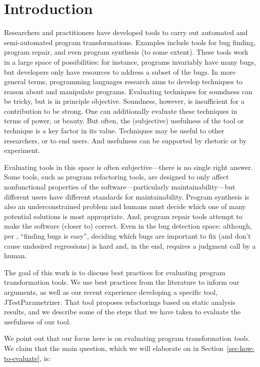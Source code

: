 \section{Introduction}
Researchers and practitioners have developed tools to carry out
automated and semi-automated program transformations.  Examples
include tools for bug finding, program repair, and even 
program synthesis (to some extent). These tools work in a large space of possibilities:
for instance, programs invariably have many bugs, but developers only have resources
to address a subset of the bugs.
In more general terms, programming languages research aims to develop
techniques to reason about and manipulate programs. Evaluating
techniques for soundness can be tricky, but is in principle
objective. Soundness, however, is insufficient for a contribution to
be strong. One can additionally evaluate these techniques in terms of
power, or beauty. But often, the (subjective) usefulness of the tool or technique
is a key factor in its value. Techniques may be useful to other researchers, or to
end users. And usefulness can be supported by rhetoric or by
experiment. 

Evaluating tools in this space is often subjective---there is no
single right answer. Some tools, such as program refactoring tools,
are designed to only affect nonfunctional properties of the
software---particularly maintainability---but different users have
different standards for maintainability. Program synthesis is also an
underconstrained problem and humans must decide which one of many
potential solutions is most appropriate. And, program repair
tools attempt to make the software (closer to) correct. Even in 
the bug detection space: although, per 
, ``finding bugs is
easy'', deciding which bugs are
important to fix (and don't cause undesired regressions) is hard and,
in the end, requires a judgment call by a human.

The goal of this work is to discuss best practices for evaluating
program transformation tools. We use best practices from the literature
to inform our arguments, as well as our recent experience developing
a specific tool, JTestParametrizer. That tool proposes
refactorings based on static analysis results, and we describe some of the
steps that we have taken to evaluate the usefulness of our tool.

We point out that our focus here is on evaluating program transformation \emph{tools}.
We claim that the main question, which we will elaborate on in Section~\ref{sec:how-to-evaluate}, is:


